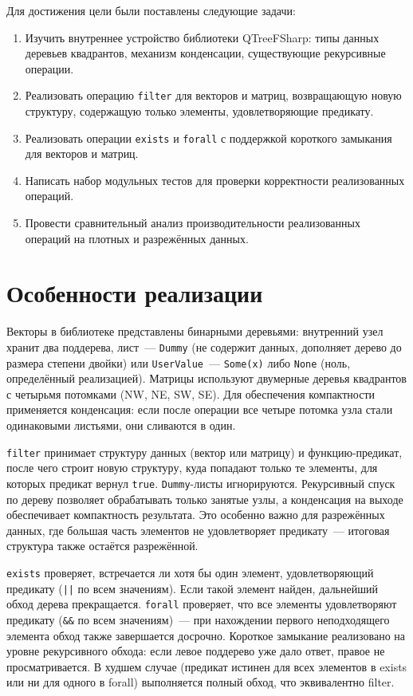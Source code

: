 \documentclass[a4paper]{article}
\begin{document}
Для достижения цели были поставлены следующие задачи:
\begin{enumerate}
    \item Изучить внутреннее устройство библиотеки QTreeFSharp: типы данных деревьев квадрантов, механизм конденсации, существующие рекурсивные операции.
    \item Реализовать операцию \texttt{filter} для векторов и матриц, возвращающую новую структуру, содержащую только элементы, удовлетворяющие предикату.
    \item Реализовать операции \texttt{exists} и \texttt{forall} с поддержкой короткого замыкания для векторов и матриц.
    \item Написать набор модульных тестов для проверки корректности реализованных операций.
    \item Провести сравнительный анализ производительности реализованных операций на плотных и разрежённых данных.
\end{enumerate}

\section{Особенности реализации}

Векторы в библиотеке представлены бинарными деревьями: внутренний узел хранит два поддерева, лист~--- \texttt{Dummy} (не содержит данных, дополняет дерево до размера степени двойки) или \texttt{UserValue}~--- \texttt{Some(x)} либо \texttt{None} (ноль, определённый реализацией). Матрицы используют двумерные деревья квадрантов с четырьмя потомками (NW, NE, SW, SE). Для обеспечения компактности применяется конденсация: если после операции все четыре потомка узла стали одинаковыми листьями, они сливаются в один.

\texttt{filter} принимает структуру данных (вектор или матрицу) и функцию-предикат, после чего строит новую структуру, куда попадают только те элементы, для которых предикат вернул \texttt{true}. \texttt{Dummy}-листы игнорируются. Рекурсивный спуск по дереву позволяет обрабатывать только занятые узлы, а конденсация на выходе обеспечивает компактность результата. Это особенно важно для разрежённых данных, где большая часть элементов не удовлетворяет предикату~--- итоговая структура также остаётся разрежённой.

\texttt{exists} проверяет, встречается ли хотя бы один элемент, удовлетворяющий предикату (\texttt{||} по всем значениям). Если такой элемент найден, дальнейший обход дерева прекращается. \texttt{forall} проверяет, что все элементы удовлетворяют предикату (\texttt{\&\&} по всем значениям)~--- при нахождении первого неподходящего элемента обход также завершается досрочно. Короткое замыкание реализовано на уровне рекурсивного обхода: если левое поддерево уже дало ответ, правое не просматривается. В худшем случае (предикат истинен для всех элементов в exists или ни для одного в forall) выполняется полный обход, что эквивалентно filter.
\end{document}
